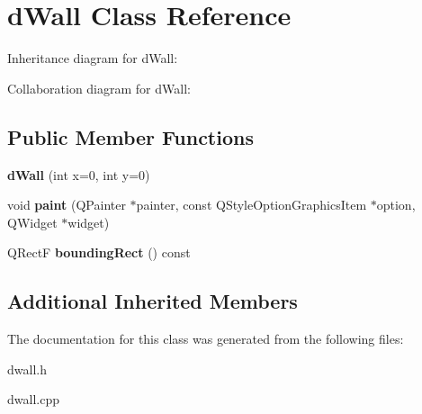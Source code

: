 \hypertarget{classd_wall}{\section{d\-Wall Class Reference}
\label{classd_wall}
}


Inheritance diagram for d\-Wall\-:


Collaboration diagram for d\-Wall\-:
\subsection*{Public Member Functions}
\begin{DoxyCompactItemize}
\item 
\hypertarget{classd_wall_a09862932157c8e5f8a59b22b3222d816}{{\bfseries d\-Wall} (int x=0, int y=0)}\label{classd_wall_a09862932157c8e5f8a59b22b3222d816}

\item 
\hypertarget{classd_wall_aeaec158ea8576bfe6d40d8197ffceaf6}{void {\bfseries paint} (Q\-Painter $\ast$painter, const Q\-Style\-Option\-Graphics\-Item $\ast$option, Q\-Widget $\ast$widget)}\label{classd_wall_aeaec158ea8576bfe6d40d8197ffceaf6}

\item 
\hypertarget{classd_wall_a84d4bba890333394f10c5497379d894c}{Q\-Rect\-F {\bfseries bounding\-Rect} () const }\label{classd_wall_a84d4bba890333394f10c5497379d894c}

\end{DoxyCompactItemize}
\subsection*{Additional Inherited Members}


The documentation for this class was generated from the following files\-:\begin{DoxyCompactItemize}
\item 
dwall.\-h\item 
dwall.\-cpp\end{DoxyCompactItemize}
